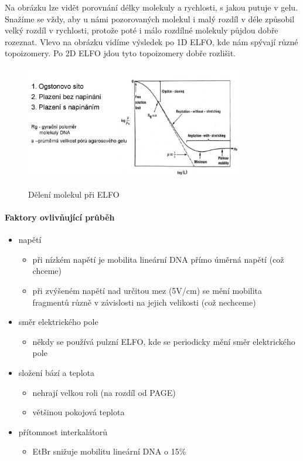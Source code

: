 \documentclass[DIV=8]{scrreprt}
\begin{document}
Na obrázku lze vidět porovnání délky molekuly a rychlosti, s jakou putuje v gelu. Snažíme se vždy, aby u námi pozorovaných molekul i malý rozdíl v déle způsobil velký rozdíl v rychlosti, protože poté i málo rozdílné molekuly půjdou dobře rozeznat. Vlevo na obrázku vidíme výsledek po 1D ELFO, kde nám spývají různé topoizomery. Po 2D ELFO jdou tyto topoizomery dobře rozlišit.
\begin{figure}
    \caption{Dělení molekul při ELFO}
    \includegraphics[width=0.85\textwidth]{slides-6/slide-10.jpg}
    \centering
    \label{}
\end{figure}


\paragraph{Faktory ovlivňující průběh}
\begin{itemize}[nosep]
    \item napětí
\begin{itemize}[nosep]
    \item při nízkém napětí je mobilita lineární DNA přímo úměrná napětí (což chceme)
    \item při zvýšeném napětí nad určitou mez (5V/cm) se mění mobilita fragmentů různě v závislosti na jejich velikosti (což nechceme)
\end{itemize}

    \item směr elektrického pole
\begin{itemize}[nosep]
    \item někdy se používá pulzní ELFO, kde se periodicky mění směr elektrického pole
\end{itemize}

    \item složení bází a teplota
\begin{itemize}[nosep]
    \item nehrají velkou roli (na rozdíl od PAGE)
    \item většinou pokojová teplota
\end{itemize}

    \item přítomnost interkalátorů
\begin{itemize}[nosep]
    \item EtBr snižuje mobilitu lineární DNA o 15\%
\end{itemize}

\end{itemize}
\end{document}
